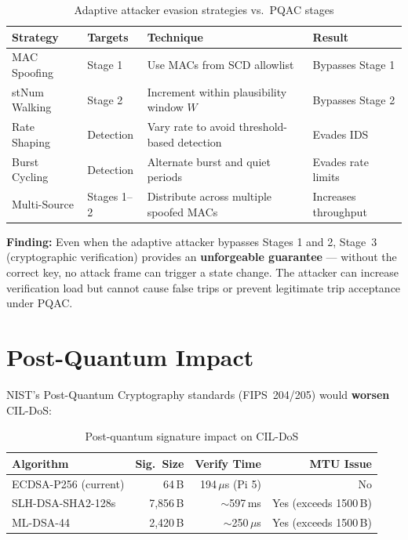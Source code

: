 \documentclass[11pt,a4paper]{article}
\begin{document}
\begin{table}[H]
\centering
\caption{Adaptive attacker evasion strategies vs.\ PQAC stages}
\begin{tabularx}{\textwidth}{@{}llXl@{}}
\toprule
\textbf{Strategy} & \textbf{Targets} & \textbf{Technique} & \textbf{Result} \\
\midrule
MAC Spoofing & Stage 1 & Use MACs from SCD allowlist & Bypasses Stage 1 \\
stNum Walking & Stage 2 & Increment within plausibility window $W$ & Bypasses Stage 2 \\
Rate Shaping & Detection & Vary rate to avoid threshold-based detection & Evades IDS \\
Burst Cycling & Detection & Alternate burst and quiet periods & Evades rate limits \\
Multi-Source & Stages 1--2 & Distribute across multiple spoofed MACs & Increases throughput \\
\bottomrule
\end{tabularx}
\end{table}

\textbf{Finding:} Even when the adaptive attacker bypasses Stages 1 and 2, Stage~3 (cryptographic verification) provides an \textbf{unforgeable guarantee} --- without the correct key, no attack frame can trigger a state change. The attacker can increase verification load but cannot cause false trips or prevent legitimate trip acceptance under PQAC.

\section{Post-Quantum Impact}

NIST's Post-Quantum Cryptography standards (FIPS~204/205) would \textbf{worsen} CIL-DoS:

\begin{table}[H]
\centering
\caption{Post-quantum signature impact on CIL-DoS}
\begin{tabular}{@{}lrrr@{}}
\toprule
\textbf{Algorithm} & \textbf{Sig.\ Size} & \textbf{Verify Time} & \textbf{MTU Issue} \\
\midrule
ECDSA-P256 (current) & 64\,B & 194\,$\mu$s (Pi 5) & No \\
SLH-DSA-SHA2-128s & 7{,}856\,B & $\sim$597\,ms & Yes (exceeds 1500\,B) \\
ML-DSA-44 & 2{,}420\,B & $\sim$250\,$\mu$s & Yes (exceeds 1500\,B) \\
\bottomrule
\end{tabular}
\end{table}
\end{document}
